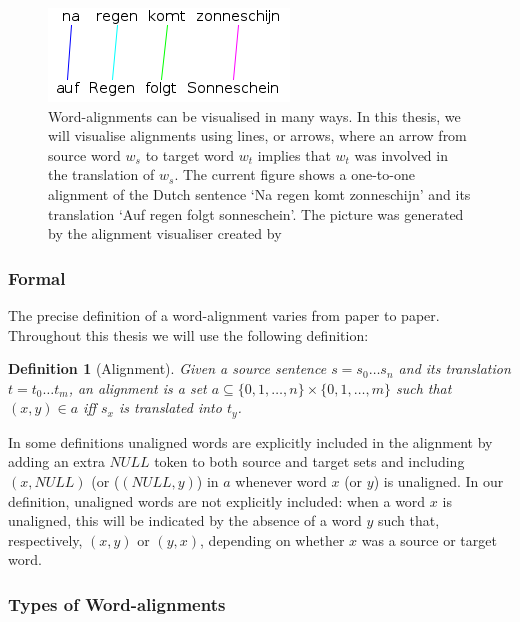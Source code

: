 \documentclass{report}
\theoremstyle{break}
\newtheorem{definition}{Definition}
\begin{document}
\begin{figure}[!ht]
\centering
\includegraphics[scale=0.6]{alignment.png}
\caption{Word-alignments can be visualised in many ways. In this thesis, we will visualise alignments using lines, or arrows, where an arrow from source word $w_s$ to target word $w_t$ implies that $w_t$ was involved in the translation of $w_s$. The current figure shows a one-to-one alignment of the Dutch sentence `Na regen komt zonneschijn' and its translation `Auf regen folgt sonneschein'. The picture was generated by the alignment visualiser created by \cite{maillette2010visualizing}}
\label{fig:alignment}
\end{figure}

\subsubsection{Formal}

The precise definition of a word-alignment varies from paper to paper. Throughout this thesis we will use the following definition:

\begin{definition}[Alignment]\label{def:alignment}
Given a source sentence $s = s_0 \ldots s_n$ and its translation $t = t_0 \ldots t_m$, an alignment is a set $a \subseteq \{0,1,\ldots,n\} \times \{0,1,\ldots,m\}$ such that $(x,y)\in a$ iff $s_x$ is translated into $t_y$.
\end{definition}

In some definitions unaligned words are explicitly included in the alignment by adding an extra $NULL$ token to both source and target sets and including $(x,NULL)$ (or ($(NULL,y)$) in $a$ whenever word $x$ (or $y$) is unaligned. In our definition, unaligned words are not explicitly included: when a word $x$ is unaligned, this will be indicated by the absence of a word $y$ such that, respectively, $(x,y)$ or $(y,x)$, depending on whether $x$ was a source or target word. 


\subsubsection{Types of Word-alignments}
\end{document}
